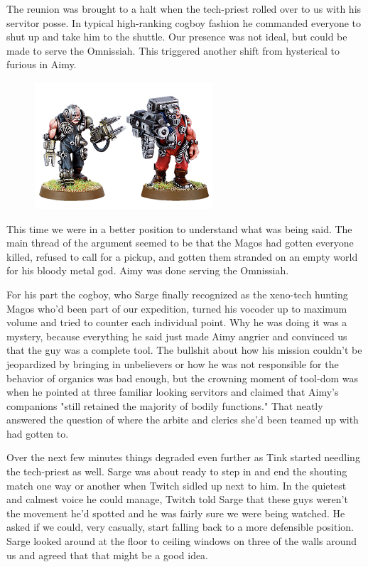 The reunion was brought to a halt when the tech-priest rolled over to us with his servitor posse. 
In typical high-ranking cogboy fashion he commanded everyone to shut up and take him to the shuttle. 
Our presence was not ideal, but could be made to serve the Omnissiah. 
This triggered another shift from hysterical to furious in Aimy.

\begin{figure}
	\begin{center}
		\includegraphics[width=\figwidth]{pics/11/20.png}
	\end{center}
\end{figure}
This time we were in a better position to understand what was being said. 
The main thread of the argument seemed to be that the Magos had gotten everyone killed, refused to call for a pickup, and gotten them stranded on an empty world for his bloody metal god. 
Aimy was done serving the Omnissiah.

For his part the cogboy, who Sarge finally recognized as the xeno-tech hunting Magos who'd been part of our expedition, turned his vocoder up to maximum volume and tried to counter each individual point. 
Why he was doing it was a mystery, because everything he said just made Aimy angrier and convinced us that the guy was a complete tool. 
The bullshit about how his mission couldn't be jeopardized by bringing in unbelievers or how he was not responsible for the behavior of organics was bad enough, but the crowning moment of tool-dom was when he pointed at three familiar looking servitors and claimed that Aimy's companions "still retained the majority of bodily functions." That neatly answered the question of where the arbite and clerics she'd been teamed up with had gotten to.

Over the next few minutes things degraded even further as Tink started needling the tech-priest as well. 
Sarge was about ready to step in and end the shouting match one way or another when Twitch sidled up next to him. 
In the quietest and calmest voice he could manage, Twitch told Sarge that these guys weren't the movement he'd spotted and he was fairly sure we were being watched. 
He asked if we could, very casually, start falling back to a more defensible position. 
Sarge looked around at the floor to ceiling windows on three of the walls around us and agreed that that might be a good idea.

